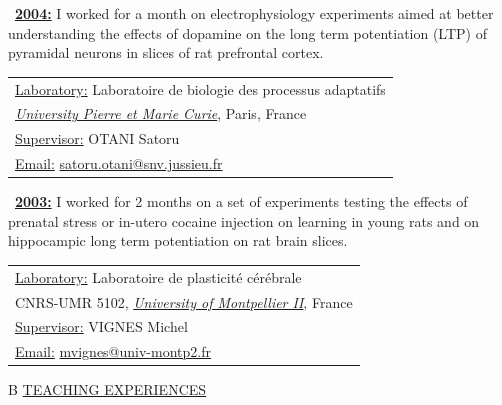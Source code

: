 \documentclass[a4paper,12pt,oneside]{letter}
\begin{document}
{\begin{minipage}[c]{6.7cm}
\textbullet~\underline{\textbf{2004:}}	I worked for a month on electrophysiology experiments aimed at better understanding the effects of dopamine on the long term potentiation (LTP) of pyramidal neurons in slices of rat prefrontal cortex.
\end{minipage}
\hspace{3mm}
\begin{minipage}[c]{\textwidth}
\setlength\minrowclearance{0.1cm}
\setlength\arrayrulewidth{1.5pt}
\small
\begin{tabular}[c]{|l|}\hline
\underline{Laboratory:} Laboratoire de biologie des processus adaptatifs\\
\href{http://www.upmc.fr/}{\textit{University Pierre et Marie Curie}}, Paris, France\\
\underline{Supervisor:} OTANI Satoru\\
\underline{Email:} \href{mailto:satoru.otani@snv.jussieu.fr}{satoru.otani@snv.jussieu.fr}\\ \hline
\end{tabular}
\end{minipage}

\begin{minipage}[c]{7.7cm}
\textbullet~\underline{\textbf{2003:}}	I worked for 2 months on a set of experiments testing the effects of prenatal stress or in-utero cocaine injection on learning in young rats and on hippocampic long term potentiation on rat brain slices.
\end{minipage}
\hspace{3mm}
\begin{minipage}[c]{\textwidth}
\setlength\minrowclearance{0.1cm}
\setlength\arrayrulewidth{1.5pt}
\small
\begin{tabular}[c]{|l|}\hline
\underline{Laboratory:} Laboratoire de plasticité cérébrale\\
CNRS-UMR 5102, \href{http://www.univ-montp2.fr/}{\textit{University of Montpellier II}}, France\\
\underline{Supervisor:} VIGNES Michel\\
\underline{Email:} \href{mailto:mvignes@univ-montp2.fr}{mvignes@univ-montp2.fr}\\ \hline
\end{tabular}
\end{minipage}

\begin{tabular}{B}
\underline{TEACHING EXPERIENCES}
\end{tabular}

}
\end{document}
